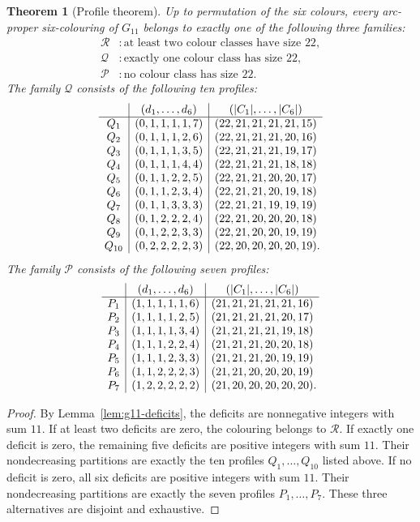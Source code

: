 \documentclass[11pt]{article}
\newtheorem{theorem}{Theorem}
\theoremstyle{definition}
\theoremstyle{remark}
\begin{document}
\begin{theorem}[Profile theorem]\label{thm:g11-profiles}
Up to permutation of the six colours, every arc-proper six-colouring of
\(G_{11}\) belongs to exactly one of the following three families:
\[
\begin{aligned}
  \mathcal R &: \text{at least two colour classes have size }22,\\
  \mathcal Q &: \text{exactly one colour class has size }22,\\
  \mathcal P &: \text{no colour class has size }22.
\end{aligned}
\]
The family \(\mathcal Q\) consists of the following ten profiles:
\[
\begin{array}{c|c|c}
 & (d_1,\ldots,d_6) & (|C_1|,\ldots,|C_6|)\\
\hline
Q_1  &(0,1,1,1,1,7)&(22,21,21,21,21,15)\\
Q_2  &(0,1,1,1,2,6)&(22,21,21,21,20,16)\\
Q_3  &(0,1,1,1,3,5)&(22,21,21,21,19,17)\\
Q_4  &(0,1,1,1,4,4)&(22,21,21,21,18,18)\\
Q_5  &(0,1,1,2,2,5)&(22,21,21,20,20,17)\\
Q_6  &(0,1,1,2,3,4)&(22,21,21,20,19,18)\\
Q_7  &(0,1,1,3,3,3)&(22,21,21,19,19,19)\\
Q_8  &(0,1,2,2,2,4)&(22,21,20,20,20,18)\\
Q_9  &(0,1,2,2,3,3)&(22,21,20,20,19,19)\\
Q_{10}&(0,2,2,2,2,3)&(22,20,20,20,20,19)\rlap{.}
\end{array}
\]
The family \(\mathcal P\) consists of the following seven profiles:
\[
\begin{array}{c|c|c}
 & (d_1,\ldots,d_6) & (|C_1|,\ldots,|C_6|)\\
\hline
P_1 &(1,1,1,1,1,6)&(21,21,21,21,21,16)\\
P_2 &(1,1,1,1,2,5)&(21,21,21,21,20,17)\\
P_3 &(1,1,1,1,3,4)&(21,21,21,21,19,18)\\
P_4 &(1,1,1,2,2,4)&(21,21,21,20,20,18)\\
P_5 &(1,1,1,2,3,3)&(21,21,21,20,19,19)\\
P_6 &(1,1,2,2,2,3)&(21,21,20,20,20,19)\\
P_7 &(1,2,2,2,2,2)&(21,20,20,20,20,20)\rlap{.}
\end{array}
\]
\end{theorem}

\begin{proof}
By Lemma~\ref{lem:g11-deficits}, the deficits are nonnegative integers with
sum \(11\).
If at least two deficits are zero, the colouring belongs to \(\mathcal R\).
If exactly one deficit is zero, the remaining five deficits are positive
integers with sum \(11\).  Their nondecreasing partitions are exactly the
ten profiles \(Q_1,\ldots,Q_{10}\) listed above.
If no deficit is zero, all six deficits are positive integers with sum
\(11\).  Their nondecreasing partitions are exactly the seven profiles
\(P_1,\ldots,P_7\).
These three alternatives are disjoint and exhaustive.
\end{proof}
\end{document}
